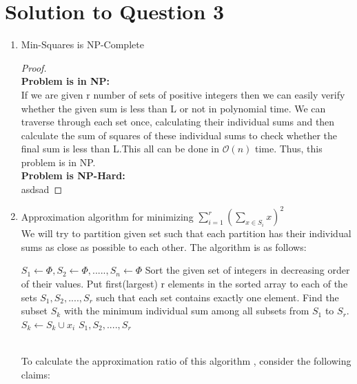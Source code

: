 \documentclass[11pt]{article}
\begin{document}
\section{Solution to Question 3}
\begin{enumerate}
    \item Min-Squares is NP-Complete
    \begin{proof}\\
  \textbf{Problem is in NP:} \\
   If we are given r number of sets of positive integers then we can easily verify whether the given sum is less than L or not in polynomial time. We can traverse through each set once, calculating their individual sums and then calculate the sum of squares of these individual sums to check whether the final sum is less than L.This all can be done in $\mathcal{O}(n)$ time.
   Thus, this problem is in NP. \\
  \textbf{Problem is NP-Hard:} \\
  asdsad 
   \end{proof}
   \item Approximation algorithm for minimizing $\sum_{i=1}^r (\sum_{x \in S_i} x)^2$ \\
   We will try to partition given set such that each partition has their individual sums as close as possible to each other. The algorithm is as follows:
   \begin{algorithm}
  \begin{algorithmic}
      \State $S_1 \leftarrow \Phi, S_2 \leftarrow \Phi,.....,S_n \leftarrow \Phi$
      \State Sort the given set of integers in decreasing order of their values.
      \State Put first(largest) r elements in the sorted array to each of the sets $S_1, S_2, ...., S_r$ such that each set contains exactly one element.
        \State Find the subset $S_k$ with the minimum individual sum among all subsets from $S_1$ to $S_r$. 
        \State $S_k \leftarrow S_k \cup {x_i}$
        \EndFor
      \State \Return $S_1, S_2, ...., S_r$
    \EndFunction
    \end{algorithmic}
    \end{algorithm}\\
    To calculate the approximation ratio of this algorithm , consider the following claims:
    

\end{enumerate}
\end{document}
